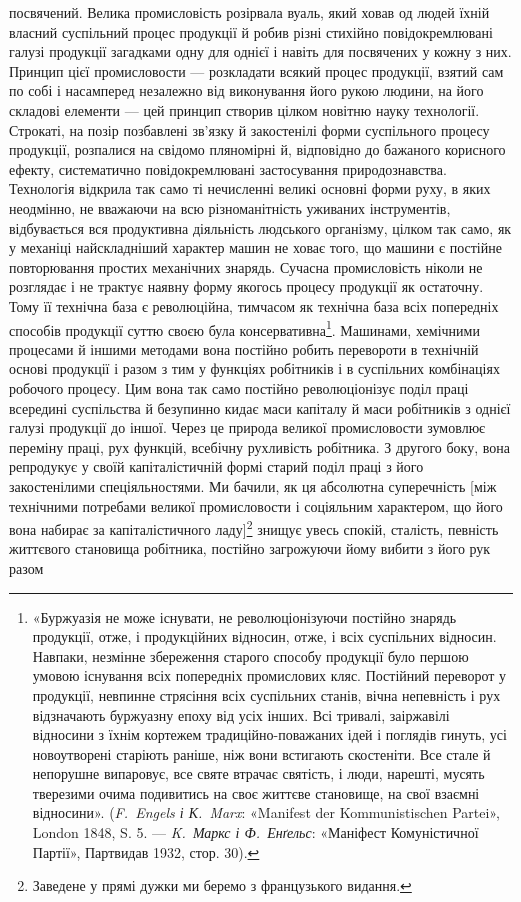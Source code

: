 \parcont{}  %
посвячений. Велика промисловість розірвала вуаль, який ховав
од людей їхній власний суспільний процес продукції й робив
різні стихійно повідокремлювані галузі продукції загадками
одну для однієї і навіть для посвячених у кожну з них. Принцип
цієї промисловости — розкладати всякий процес продукції, взятий
сам по собі і насамперед незалежно від виконування його
рукою людини, на його складові елементи — цей принцип створив
цілком новітню науку технології. Строкаті, на позір позбавлені
зв’язку й закостенілі форми суспільного процесу продукції,
розпалися на свідомо пляномірні й, відповідно до бажаного корисного
ефекту, систематично повідокремлювані застосування
природознавства. Технологія відкрила так само ті нечисленні
великі основні форми руху, в яких неодмінно, не вважаючи на
всю різноманітність уживаних інструментів, відбувається вся
продуктивна діяльність людського організму, цілком так само,
як у механіці найскладніший характер машин не ховає того,
що машини є постійне повторювання простих механічних знарядь.
Сучасна промисловість ніколи не розглядає і не трактує наявну
форму якогось процесу продукції як остаточну. Тому її технічна
база є революційна, тимчасом як технічна база всіх попередніх
способів продукції суттю своєю була консервативна\footnote{
«Буржуазія не може існувати, не революціонізуючи постійно
знарядь продукції, отже, і продукційних відносин, отже, і всіх суспільних
відносин. Навпаки, незмінне збереження старого способу продукції було
першою умовою існування всіх попередніх промислових кляс. Постійний
переворот у продукції, невпинне стрясіння всіх суспільних станів, вічна
непевність і рух відзначають буржуазну епоху від усіх інших. Всі тривалі,
заіржавілі відносини з їхнім кортежем традиційно-поважаних ідей і
поглядів гинуть, усі новоутворені старіють раніше, ніж вони встигають
скостеніти. Все стале й непорушне випаровує, все святе втрачає святість,
і люди, нарешті, мусять тверезими очима подивитись на своє життєве
становище, на свої взаємні відносини». (\emph{F.~Engels і К.~Marx}: «Manifest
der Kommunistischen Partei», London 1848, S. 5. — \emph{K.~Маркс
і Ф.~Енґельс}: «Маніфест Комуністичної Партії», Партвидав 1932, стор. 30).
}. Машинами, хемічними процесами й іншими методами вона постійно
робить перевороти в технічній основі продукції і разом з тим
у функціях робітників і в суспільних комбінаціях робочого процесу.
Цим вона так само постійно революціонізує поділ праці
всередині суспільства й безупинно кидає маси капіталу й маси
робітників з однієї галузі продукції до іншої. Через це природа
великої промисловости зумовлює переміну праці, рух функцій,
всебічну рухливість робітника. З другого боку, вона репродукує
у своїй капіталістичній формі старий поділ праці з його закостенілими
спеціяльностями. Ми бачили, як ця абсолютна суперечність
[між технічними потребами великої промисловости і соціяльним
характером, що його вона набирає за капіталістичного ладу]\footnote*{
Заведене у прямі дужки ми беремо з французького видання. 
}
знищує увесь спокій, сталість, певність життєвого становища
робітника, постійно загрожуючи йому вибити з його рук разом
\parbreak{}  %
